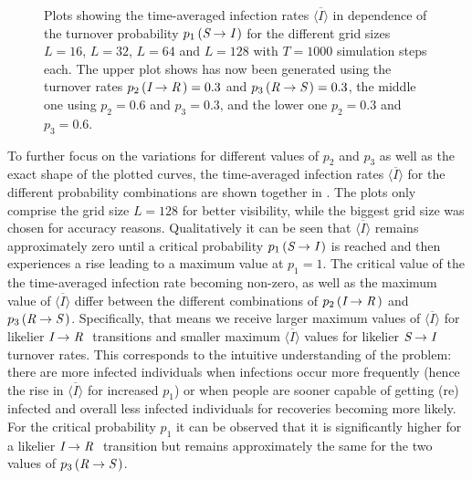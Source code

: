 \begin{figure}[ht]
    \centering
    \resizebox{\textwidth}{!}{}
    \caption{Plots showing the time-averaged infection rates $\overline{\langle I\rangle}$ in dependence of the turnover probability $p_1\left(\textit{S}\rightarrow\textit{I}\,\right)$
    for the different grid sizes $L=16$, $L=32$, $L=64$ and $L=128$ with $T=1000$ simulation steps each. The upper plot shows has now been generated using the turnover rates 
    $p_2\left(\textit{I}\rightarrow\textit{R}\,\right)=0.3$ and $p_3\left(\textit{R}\rightarrow\textit{S}\,\right)=0.3$, 
    the middle one using $p_2=0.6$ and $p_3=0.3$, and the lower one $p_2=0.3$ and $p_3=0.6$.}\label{fig:res_dis_avg_inf_over_p1}
\end{figure}

To further focus on the variations for different values of $p_2$ and $p_3$ as well as the exact shape of the plotted curves, the time-averaged infection rates $\overline{\langle I\rangle}$ for the different probability 
combinations are shown together in . The plots only comprise the grid size $L=128$ for better visibility, while the biggest grid size was chosen for accuracy reasons. 
Qualitatively it can be seen that $\overline{\langle I\rangle}$ remains approximately zero until a critical probability $p_1\left(\textit{S}\rightarrow\textit{I}\,\right)$ is reached and then
experiences a rise leading to a maximum value at $p_1=1$. The critical value of the the time-averaged infection rate becoming non-zero, as well as the maximum value of $\overline{\langle I\rangle}$ 
differ between the different combinations of $p_2\left(\textit{I}\rightarrow\textit{R}\,\right)$ and $p_3\left(\textit{R}\rightarrow\textit{S}\,\right)$. Specifically, that means we receive larger maximum values
of $\overline{\langle I\rangle}$ for likelier $\textit{I}\rightarrow\textit{R}~$ transitions and smaller maximum $\overline{\langle I\rangle}$ values for likelier $\textit{S}\rightarrow\textit{I}~$
turnover rates. This corresponds to the intuitive understanding of the problem: there are more infected individuals when infections occur more frequently (hence the rise in $\overline{\langle I\rangle}$ for increased $p_1$) 
or when people are sooner capable of getting (re)\,infected and overall less infected individuals for recoveries becoming more likely. For the critical probability $p_1$ it can be observed that
it is significantly higher for a likelier $\textit{I}\rightarrow\textit{R}~$ transition but remains approximately the same for the two values of $p_3\left(\textit{R}\rightarrow\textit{S}\,\right)$.

